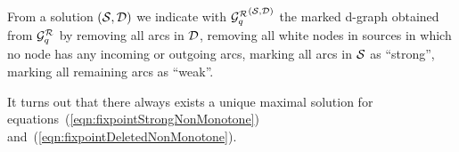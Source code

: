 From a solution $(\S,\D)$ we indicate with ${\GqR}^{(\S,\D)}$ the marked d-graph obtained from $\GqR$ by
\myi removing all arcs in $\D$,
\myii removing all white nodes in sources in which no node has any incoming or outgoing arcs,
\myiii marking all arcs in $\S$ as ``strong'',
\myiv marking all remaining arcs as ``weak''.

It turns out that there always exists a unique maximal solution for
equations~(\ref{eqn:fixpointStrongNonMonotone})
and~(\ref{eqn:fixpointDeletedNonMonotone}).
%
